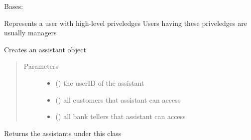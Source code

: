 \documentclass[letterpaper,10pt,english]{sphinxmanual}
\begin{document}
\begin{fulllineitems}
\label{\detokenize{bank:bank.manager.Manager}}
Bases: 

Represents a user with high-level priveledges
Users having these priveledges are usually managers

\begin{fulllineitems}
\label{\detokenize{bank:bank.manager.Manager.createAssistant}}
Creates an assistant object
\begin{quote}\begin{description}
\item[{Parameters}] \leavevmode\begin{itemize}
\item {} 
 () \textendash{} the userID of the assistant

\item {} 
 () \textendash{} all customers that assistant can access

\item {} 
 () \textendash{} all bank tellers that assistant can access

\end{itemize}

\end{description}\end{quote}

\end{fulllineitems}


\begin{fulllineitems}
\label{\detokenize{bank:bank.manager.Manager.viewAssistants}}
Returns the assistants under this class

\end{fulllineitems}


\end{fulllineitems}
\end{document}
